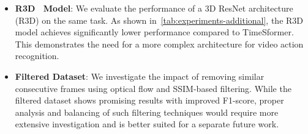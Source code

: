 \begin{itemize}
    \item \textbf{R3D~\cite{TODO} Model}: We evaluate the performance of a 3D ResNet architecture (R3D) on the same task.
     As shown in~\autoref{tab:experiments-additional}, the R3D model achieves significantly lower performance compared to TimeSformer.
     This demonstrates the need for a more complex architecture for video action recognition.
    
    \item \textbf{Filtered Dataset}: We investigate the impact of removing similar consecutive frames using optical flow and SSIM-based filtering.
    While the filtered dataset shows promising results with improved F1-score, proper analysis and balancing of such filtering techniques would require more extensive investigation and is better suited for a separate future work.
\end{itemize}
